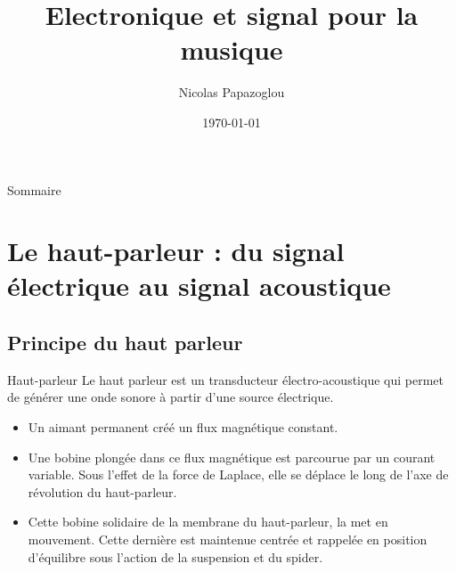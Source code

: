 \documentclass[aspectratio=169]{beamer}
\title{Electronique et signal pour la musique}
\date{\today}
\author[PAPAZOGLOU]{Nicolas Papazoglou}
\institute[ENSEA]{ENSEA}
\begin{document}
\begin{frame}
	\titlepage
\end{frame}

\begin{frame}{Sommaire}
	\tableofcontents
\end{frame}
\section{Le haut-parleur : du signal électrique au signal acoustique}
\subsection{Principe du haut parleur}
\begin{frame}{Haut-parleur}
Le haut parleur est un transducteur électro-acoustique qui permet de générer une onde sonore à partir d'une source électrique.
\begin{itemize}
	\item Un aimant permanent créé un flux magnétique constant.
	\item Une bobine plongée dans ce flux magnétique est parcourue par un courant variable. Sous l'effet de la force de Laplace, elle se déplace le long de l'axe de révolution du haut-parleur.
	\item Cette bobine solidaire de la membrane du haut-parleur, la met en mouvement. Cette dernière est maintenue centrée et rappelée en position d'équilibre sous l'action de la suspension et du spider.
\end{itemize}		
\end{frame}
\end{document}
